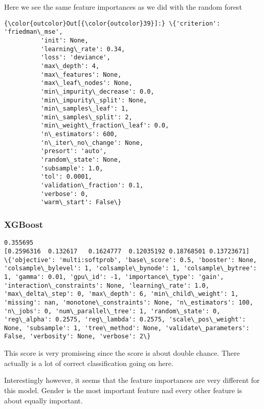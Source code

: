 \documentclass[11pt]{article}
\begin{document}
    Here we see the same feature importances as we did with the random
forest

\begin{Verbatim}[commandchars=\\\{\}]
{\color{outcolor}Out[{\color{outcolor}39}]:} \{'criterion': 'friedman\_mse',
          'init': None,
          'learning\_rate': 0.34,
          'loss': 'deviance',
          'max\_depth': 4,
          'max\_features': None,
          'max\_leaf\_nodes': None,
          'min\_impurity\_decrease': 0.0,
          'min\_impurity\_split': None,
          'min\_samples\_leaf': 1,
          'min\_samples\_split': 2,
          'min\_weight\_fraction\_leaf': 0.0,
          'n\_estimators': 600,
          'n\_iter\_no\_change': None,
          'presort': 'auto',
          'random\_state': None,
          'subsample': 1.0,
          'tol': 0.0001,
          'validation\_fraction': 0.1,
          'verbose': 0,
          'warm\_start': False\}
\end{Verbatim}
            
    \hypertarget{xgboost}{%
\subsubsection{XGBoost}\label{xgboost}}

    \begin{Verbatim}[commandchars=\\\{\}]
0.355695
[0.2596316  0.132617   0.1624777  0.12035192 0.18768501 0.13723671]
\{'objective': 'multi:softprob', 'base\_score': 0.5, 'booster': None, 'colsample\_bylevel': 1, 'colsample\_bynode': 1, 'colsample\_bytree': 1, 'gamma': 0.01, 'gpu\_id': -1, 'importance\_type': 'gain', 'interaction\_constraints': None, 'learning\_rate': 1.0, 'max\_delta\_step': 0, 'max\_depth': 6, 'min\_child\_weight': 1, 'missing': nan, 'monotone\_constraints': None, 'n\_estimators': 100, 'n\_jobs': 0, 'num\_parallel\_tree': 1, 'random\_state': 0, 'reg\_alpha': 0.2575, 'reg\_lambda': 0.2575, 'scale\_pos\_weight': None, 'subsample': 1, 'tree\_method': None, 'validate\_parameters': False, 'verbosity': None, 'verbose': 2\}

    \end{Verbatim}

    This score is very promiseing since the score is about double chance.
There actually is a lot of correct classification going on here.

Interestingly however, it seems that the feature importances are very
different for this model. Gender is the most important feature nad every
other feature is about equally important.
\end{document}
